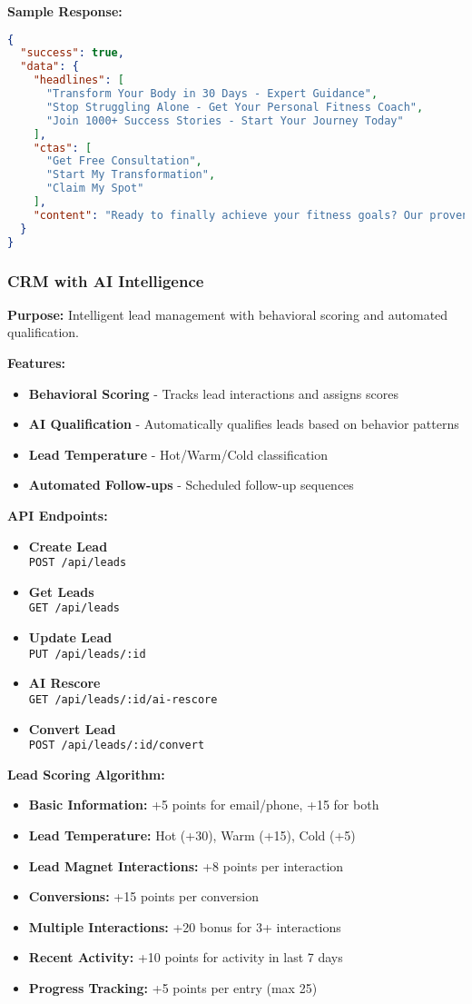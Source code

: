 \documentclass[12pt,a4paper]{article}
\newcommand{\apiendpoint}[2]{\textbf{#1} \\ \texttt{#2}}
\newcommand{\samplecode}[1]{\begin{lstlisting}[language=JSON]#1\end{lstlisting}}
\begin{document}
\textbf{Sample Response:}
\samplecode{
{
  "success": true,
  "data": {
    "headlines": [
      "Transform Your Body in 30 Days - Expert Guidance",
      "Stop Struggling Alone - Get Your Personal Fitness Coach",
      "Join 1000+ Success Stories - Start Your Journey Today"
    ],
    "ctas": [
      "Get Free Consultation",
      "Start My Transformation",
      "Claim My Spot"
    ],
    "content": "Ready to finally achieve your fitness goals? Our proven system has helped over 1000 clients transform their lives. Get personalized guidance from certified experts who understand your journey..."
  }
}
}

\subsubsection{CRM with AI Intelligence}
\textbf{Purpose:} Intelligent lead management with behavioral scoring and automated qualification.

\textbf{Features:}
\begin{itemize}
    \item \textbf{Behavioral Scoring} - Tracks lead interactions and assigns scores
    \item \textbf{AI Qualification} - Automatically qualifies leads based on behavior patterns
    \item \textbf{Lead Temperature} - Hot/Warm/Cold classification
    \item \textbf{Automated Follow-ups} - Scheduled follow-up sequences
\end{itemize}

\textbf{API Endpoints:}
\begin{itemize}
    \item \apiendpoint{Create Lead}{POST /api/leads}
    \item \apiendpoint{Get Leads}{GET /api/leads}
    \item \apiendpoint{Update Lead}{PUT /api/leads/:id}
    \item \apiendpoint{AI Rescore}{GET /api/leads/:id/ai-rescore}
    \item \apiendpoint{Convert Lead}{POST /api/leads/:id/convert}
\end{itemize}

\textbf{Lead Scoring Algorithm:}
\begin{itemize}
    \item \textbf{Basic Information:} +5 points for email/phone, +15 for both
    \item \textbf{Lead Temperature:} Hot (+30), Warm (+15), Cold (+5)
    \item \textbf{Lead Magnet Interactions:} +8 points per interaction
    \item \textbf{Conversions:} +15 points per conversion
    \item \textbf{Multiple Interactions:} +20 bonus for 3+ interactions
    \item \textbf{Recent Activity:} +10 points for activity in last 7 days
    \item \textbf{Progress Tracking:} +5 points per entry (max 25)
\end{itemize}
\end{document}
